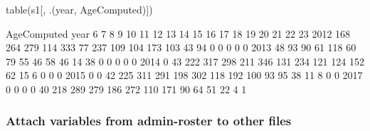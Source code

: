\begin{Schunk}
\begin{Sinput}
table(s1[, .(year, AgeComputed)])
\end{Sinput}
\begin{Soutput}
      AgeComputed
year     6   7   8   9  10  11  12  13  14  15  16  17  18  19  20  21  22  23
  2012 168 264 279 114 333  77 237 109 104 173 103  43  94   0   0   0   0   0
  2013  48  93  90  61 118  60  79  55  46  58  46  14  38   0   0   0   0   0
  2014   0  43 222 317 298 211 346 131 234 121 124 152  62  15   6   0   0   0
  2015   0   0  42 225 311 291 198 302 118 192 100  93  95  38  11   8   0   0
  2017   0   0   0   0  40 218 289 279 186 272 110 171  90  64  51  22   4   1
\end{Soutput}
\end{Schunk}

\subsubsection{Attach variables from admin-roster to other files}


